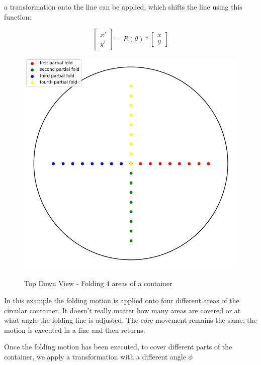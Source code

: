 a transformation onto the line can be applied, which shifts the line using this function: 

\[\begin{bmatrix} x' \\ y' \end{bmatrix} = R(\theta) * \begin{bmatrix} x \\ y \end{bmatrix}\]

\begin{figure}[H]
    \includegraphics[scale=0.35]{Graphics/motions/folding0.png}
    \centering
    \label{fig:foldingMotion1}
    \caption{Top Down View - Folding 4 areas of a container}
\end{figure}

In this example the folding motion is applied onto four different areas of the circular container. 
It doesn't really matter how many areas are covered or at what angle the folding line is adjusted. 
The core movement remains the same: the motion is executed in a line and then returns.

Once the folding motion has been executed, to cover different parts of the container, we apply a transformation with a different angle $\phi$

